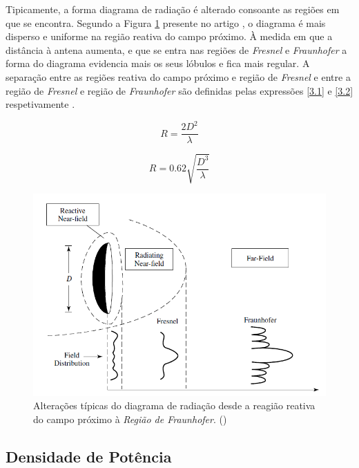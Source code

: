 Tipicamente, a forma diagrama de radiação é alterado consoante as regiões em que se encontra. Segundo a Figura \ref{fig:alt_tipicas_regioes} presente no artigo \cite{Y.RahmatL.WilliamsR.Yoccarino1995}, o diagrama é mais disperso e uniforme na região reativa do campo próximo. À medida em que a distância à antena aumenta, e que se entra nas regiões de \textit{Fresnel} e \textit{Fraunhofer} a forma do diagrama evidencia mais os seus lóbulos e fica mais regular. A separação entre as regiões reativa do campo próximo e região de \textit{Fresnel} e entre a região de \textit{Fresnel} e região de \textit{Fraunhofer} são definidas pelas expressões \ref{3.1} e \ref{3.2} respetivamente \parencite{Y.RahmatL.WilliamsR.Yoccarino1995}.

\begin{equation} \label{3.1}
R=\dfrac{2D^{2}}{\lambda}
\end{equation}

\begin{equation} \label{3.2}
R=0.62\sqrt{\dfrac{D^{3}}{\lambda}}
\end{equation}

\begin{figure}[h]
\centering
\includegraphics[scale=0.6]{chapters/ch3/assets/alt_tipicas_regioes}
\decoRule
\caption[Alterações típicas da forma do diagrama de radiação]{Alterações típicas do diagrama de radiação desde a reagião reativa do campo próximo à \textit{Região de Fraunhofer}. (\parencite{Y.RahmatL.WilliamsR.Yoccarino1995})}
\label{fig:alt_tipicas_regioes}
\end{figure}



\subsection*{Densidade de Potência}


